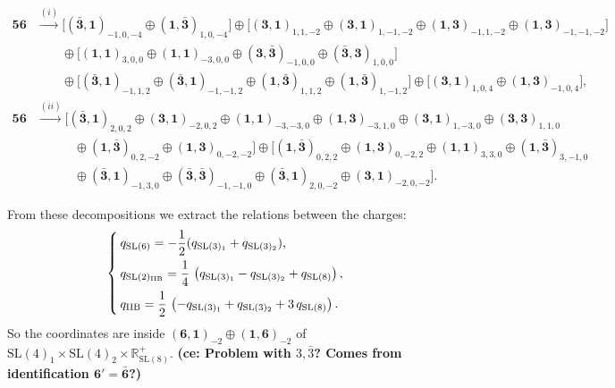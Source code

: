 \documentclass[11pt]{article}
\newcommand{\SL}{\ensuremath{\mathrm{SL}}\xspace}
\newcommand{\R}{\ensuremath{\mathbb{R}}\xspace}
\newcommand{\ce}[1]{\marginpar{\parbox{\marginparwidth}{\boldmath $\Longleftarrow$}}
{\boldmath\bfseries (ce: #1)}}
\begin{document}
  \begin{equation}
    \begin{aligned}
    \bm{56} &\overset{(i)}{\longrightarrow} \Big[(\bm{\bar{3}},\bm{1})_{-1,0,-4} \oplus (\bm{1},\bm{\bar{3}})_{1,0,-4}\Big] \oplus \Big[(\bm{3},\bm{1})_{1,1,-2} \oplus (\bm{3},\bm{1})_{1,-1,-2} \oplus (\bm{1},\bm{3})_{-1,1,-2} \oplus (\bm{1},\bm{3})_{-1,-1,-2}\Big] \\
    &\qquad \oplus \Big[(\bm{1},\bm{1})_{3,0,0} \oplus (\bm{1},\bm{1})_{-3,0,0} \oplus (\bm{3},\bm{\bar{3}})_{-1,0,0} \oplus (\bm{\bar{3}},\bm{3})_{1,0,0}\Big] \\
    &\qquad \oplus \Big[(\bm{\bar{3}},\bm{1})_{-1,1,2} \oplus (\bm{\bar{3}},\bm{1})_{-1,-1,2} \oplus (\bm{1},\bm{\bar{3}})_{1,1,2} \oplus (\bm{1},\bm{\bar{3}})_{1,-1,2}\Big] \oplus \Big[(\bm{3},\bm{1})_{1,0,4} \oplus (\bm{1},\bm{3})_{-1,0,4}\Big],\\[10pt]
    \bm{56} &\overset{(ii)}{\longrightarrow} \Big[(\bm{\bar{3}},\bm{1})_{2,0,2} \oplus (\bm{3},\bm{1})_{-2,0,2} \oplus (\bm{1},\bm{1})_{-3,-3,0} \oplus (\bm{1},\bm{3})_{-3,1,0}\oplus (\bm{3},\bm{1})_{1,-3,0} \oplus (\bm{3},\bm{3})_{1,1,0}\\
      &\quad\qquad \oplus (\bm{1},\bm{\bar{3}})_{0,2,-2} \oplus (\bm{1},\bm{3})_{0,-2,-2}\Big] \oplus \Big[(\bm{1},\bm{\bar{3}})_{0,2,2} \oplus (\bm{1},\bm{3})_{0,-2,2} \oplus (\bm{1},\bm{1})_{3,3,0} \oplus (\bm{1},\bm{\bar{3}})_{3,-1,0}\\
      &\quad\qquad \oplus (\bm{\bar{3}},\bm{1})_{-1,3,0} \oplus (\bm{\bar{3}},\bm{\bar{3}})_{-1,-1,0} \oplus (\bm{\bar{3}},\bm{1})_{2,0,-2} \oplus (\bm{3},\bm{1})_{-2,0,-2}\Big].
    \end{aligned}
  \end{equation}

  From these decompositions we extract the relations between the charges:
  \begin{equation}
    \begin{cases}
    q_{\SL(6)} = -\dfrac{1}{2}(q_{\SL(3)_{1}}+q_{\SL(3)_{2}}), \\[7pt]
    q_{\SL(2)_{\rm IIB}} = \dfrac{1}{4}\,\left(q_{\SL(3)_{1}}-q_{\SL(3)_{2}}+q_{\SL(8)}\right), \\[7pt]
    q_{\rm IIB} = \dfrac{1}{2}\,\left(-q_{\SL(3)_{1}}+q_{\SL(3)_{2}}+3\,q_{\SL(8)}\right).
    \end{cases}
  \end{equation}
  So the coordinates are inside $(\bm{6},\bm{1})_{-2}\oplus(\bm{1},\bm{6})_{-2}$ of $\SL(4)_{1}\times\SL(4)_{2}\times\R^{+}_{\SL(8)}$. \ce{Problem with $3, \bar{3}$? Comes from identification $\bm{6'}=\bm{\bar{6}}$?}
\end{document}
